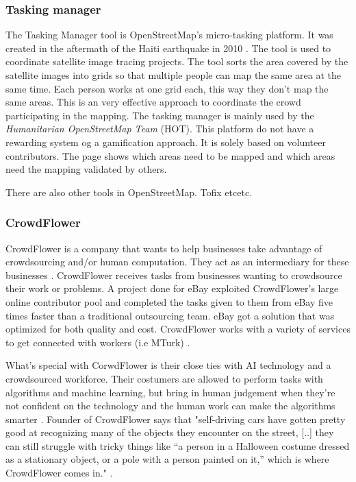 \subsubsection{Tasking manager}\label{sec:taskingmanager}
The Tasking Manager tool is OpenStreetMap's micro-tasking platform. It was created in the aftermath of the Haiti earthquake in 2010 \citep{Palen2015}. The tool is used to coordinate satellite image tracing projects. The tool sorts the area covered by the satellite images into grids so that multiple people can map the same area at the same time. Each person works at one grid each, this way they don't map the same areas. This is an very effective approach to coordinate the crowd participating in the mapping. The tasking manager is mainly used by the \textit{Humanitarian OpenStreetMap Team} (HOT). This platform do not have a rewarding system og a gamification approach. It is solely based on volunteer contributors. The page shows which areas need to be mapped and which areas need the mapping validated by others. 

There are also other tools in OpenStreetMap. Tofix etcetc. 

\subsubsection{CrowdFlower}  
CrowdFlower is a company that wants to help businesses take advantage of crowdsourcing and/or human computation. They act as an intermediary for these businesses \citep{Quinn2011}. CrowdFlower receives tasks from businesses wanting to crowdsource their work or problems. A project done for eBay exploited CrowdFlower's large online contributor pool and completed the tasks given to them from eBay five times faster than a traditional outsourcing team. eBay got a solution that was optimized for both quality and cost. CrowdFlower works with a variety of services to get connected with workers (i.e MTurk) \citep{Quinn2011}. 

What's special with CorwdFlower is their close ties with AI technology and a crowdsourced workforce. Their costumers are allowed to perform tasks with algorithms and machine learning, but bring in human judgement when they're not confident on the technology and the human work can make the algorithms smarter \citep{Ha2016}.  Founder of CrowdFlower says that "self-driving cars have gotten pretty good at recognizing many of the objects they encounter on the street, [..] they can still struggle with tricky things like “a person in a Halloween costume dressed as a stationary object, or a pole with a person painted on it,” which is where CrowdFlower comes in." \citep{Ha2016}.

